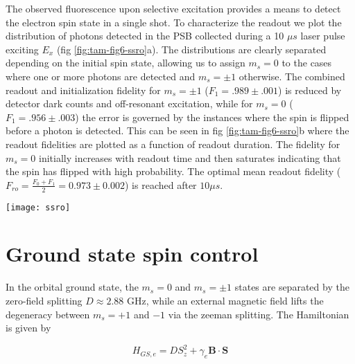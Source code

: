 The observed fluorescence upon selective excitation provides a means to detect the electron spin state in a single shot\cite{Robledo_Nature_2011}. To characterize the readout we plot the distribution of photons detected in the PSB collected during a 10 $\mu s$ laser pulse exciting $E_x$ (fig \ref{fig:tam-fig6-ssro}a). The distributions are clearly separated depending on the initial spin state, allowing us to assign $m_s = 0$ to the cases where one or more photons are detected and $m_s = \pm 1$ otherwise. The combined readout and initialization fidelity for $m_s = \pm 1$ ($F_1 = .989 \pm .001$) is reduced by detector dark counts and off-resonant excitation, while for $m_s = 0$ ($F_1 = .956 \pm .003$) the error is governed by the instances where the spin is flipped before a photon is detected. This can be seen in fig \ref{fig:tam-fig6-ssro}b where the readout fidelities are plotted as a function of readout duration. The fidelity for $m_s = 0$ initially increases with readout time and then saturates indicating that the spin has flipped with high probability. The optimal mean readout fidelity ($F_{ro} = \frac{F_0+F_1}{2} = 0.973 \pm 0.002$) is reached after $10 \mu s$.

\begin{figure*}
	\centering
	\texttt{[image: ssro]}
	\caption{\label{fig:tam-fig6-ssro} \textbf{Single shot readout} (a) Histograms of the number of detected photons in the PSB for initial state $m_s = 0$ (blue) and $m_s=\pm 1$ (red) during a 10 $\mu s$ readout on $E_x$. (b) Fidelities for reading out the electron spin state initially prepared in $m_s = 0$ (blue) and $m_s = \pm 1$ (red) as a function of readout duration. The mean readout fidelity is plotted in grey. The inset is a zoom of the region where the optimal mean readout fidelity is reached.}
\end{figure*}

\section{Ground state spin control}

In the orbital ground state, the $m_s = 0$ and $m_s = \pm 1$ states are separated by the zero-field splitting $D \approx 2.88$ GHz, while an external magnetic field lifts the degeneracy between $m_s = +1$ and $-1$ via the zeeman splitting. The Hamiltonian is given by

\begin{equation}
H_{GS,e} = D S_z^2 + \gamma_e \mathbf{B} \cdot \mathbf{S}
\end{equation}

